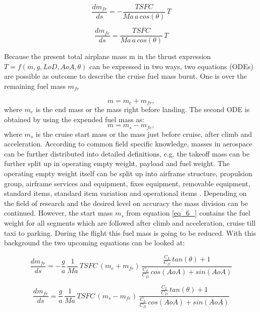 \begin{equation}
    \label{eq_3_}
    \frac{dm_{fr}}{ds} = - \frac{TSFC}{Ma\, a \, cos(\theta) }\, T
\end{equation}

\begin{equation}
    \label{eq_4}
    \frac{dm_{fe}}{ds} = \frac{TSFC}{Ma\, a \, cos(\theta) } \,T
\end{equation}

Because the present total airplane mass m 
in the thrust expression $ T = f(m,g,LoD,AoA, \theta)$ can be expressed in
two ways, two equations (ODEs) are possible 
as outcome to describe the cruise fuel mass burnt. One is over the 
remaining fuel mass $m_{fr}$

\begin{equation}
    \label{eq_5}
    m = m_e + m_{fr}  ,
\end{equation}
where $m_e$ is the end mass or the mass right before landing. 
The second ODE is obtained by using the expended fuel mass as: 
\begin{equation}
    \label{eq_6_}
    m = m_s - m_{fe}  ,
\end{equation}
where $m_s$ is the cruise start mass or the mass just 
before cruise, after climb and acceleration. 
According to common field specific knowledge, masses in aerospace 
can be further 
distributed into detailed definitions, e.g. the takeoff mass  
can be further split up in operating empty weight, 
payload and fuel weight. The operating empty weight itself 
can be split up into airframe structure, propulsion 
group, airframe services and equipment, fixes equipment, 
removable equipment, standard items, standard item 
variation and operational items \cite{torenbeek_synthesis_1982}.
Depending on the field of research and the desired 
level on accuracy the 
mass division can be continued. However, the start mass 
$m_s$ from equation \eqref{eq_6_} contains the fuel weight 
for all segments which are followed after climb and
acceleration, cruise till taxi to parking.
During the flight this fuel mass 
is going to be reduced. With this background the two 
upcoming equations can be looked at:

\begin{equation}
    \label{eq_7_}
    \frac{dm_{fr}}{ds} = - \frac{g}{a} \, \frac{1}{Ma}\,TSFC \,(m_e + m_{fr})
    \, \frac{\frac{C_L}{C_D}\,tan(\theta) + 1}{
        \frac{C_L}{C_D} \, cos(AoA) + sin(AoA)}
\end{equation}

\begin{equation}
    \label{eq_8_}
    \frac{dm_{fe}}{ds} = \frac{g}{a} \, \frac{1}{Ma}\,TSFC \,(m_s - m_{fe})
    \, \frac{\frac{C_L}{C_D}\,tan(\theta) + 1}{
        \frac{C_L}{C_D} \, cos(AoA) + sin(AoA)}
\end{equation}

